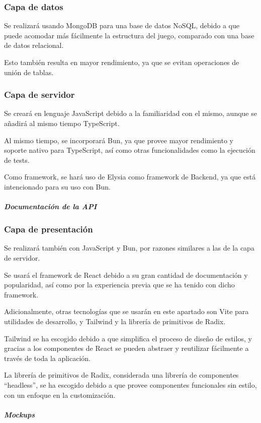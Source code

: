 \subsubsection{Capa de datos}
Se realizará usando MongoDB para una base de datos NoSQL,
debido a que puede acomodar más fácilmente la estructura del juego,
comparado con una base de datos relacional.

Esto también resulta en mayor rendimiento, ya que se evitan operaciones de unión de tablas.


\subsubsection{Capa de servidor}
Se creará en lenguaje JavaScript debido a la familiaridad con el mismo, aunque se añadirá al mismo tiempo TypeScript. 

Al mismo tiempo, se incorporará Bun,
ya que provee mayor rendimiento y soporte nativo para TypeScript,
así como otras funcionalidades como la ejecución de tests. 

Como framework, se hará uso de Elysia como framework de Backend, ya que está intencionado para su uso con Bun. 

\subparagraph{Documentación de la API}

\subsubsection{Capa de presentación}

Se realizará también con JavaScript y Bun, por razones similares a las de la capa de servidor. 

Se usará el framework de React debido a su gran cantidad de documentación y popularidad, así como por la experiencia previa que se ha tenido con dicho framework. 

Adicionalmente, otras tecnologías que se usarán en este apartado son Vite para utilidades de desarrollo, y Tailwind y la librería de primitivos de Radix. 

Tailwind se ha escogido debido a que simplifica el proceso de diseño de estilos, y gracias a los componentes de React se pueden abstraer y reutilizar fácilmente a través de toda la aplicación. 

La librería de primitivos de Radix, considerada una librería de componentes “headless”, se ha escogido debido a que provee componentes funcionales sin estilo, con un enfoque en la customización. 

\subparagraph{Mockups}
